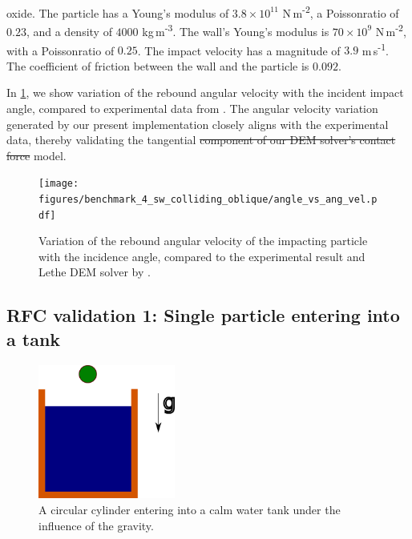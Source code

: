 \documentclass[preprint,12pt]{elsarticle}
\providecommand{\DIFaddtex}[1]{{\protect\color{blue}\uwave{#1}}} %
\providecommand{\DIFdeltex}[1]{{\protect\color{red}\sout{#1}}}                      %
\providecommand{\DIFaddbegin}{} %
\providecommand{\DIFaddend}{} %
\providecommand{\DIFdelbegin}{} %
\providecommand{\DIFdelend}{} %
\providecommand{\DIFaddbeginFL}{} %
\providecommand{\DIFaddendFL}{} %
\providecommand{\DIFdelbeginFL}{} %
\providecommand{\DIFdelendFL}{} %
\providecommand{\DIFadd}[1]{\texorpdfstring{\DIFaddtex{#1}}{#1}} %
\providecommand{\DIFdel}[1]{\texorpdfstring{\DIFdeltex{#1}}{}} %
\newcommand{\DIFscaledelfig}{0.5}
\newlength{\DIFdelgraphicswidth} %
\newlength{\DIFdelgraphicsheight} %
\newcommand{\DIFaddincludegraphics}[2][]{{\color{blue}\fbox{\DIFOincludegraphics[#1]{#2}}}} %
\newcommand{\DIFdelincludegraphics}[2][]{%
\sbox{\DIFdelgraphicsbox}{\DIFOincludegraphics[#1]{#2}}%
\settoboxwidth{\DIFdelgraphicswidth}{\DIFdelgraphicsbox} %
\settoboxtotalheight{\DIFdelgraphicsheight}{\DIFdelgraphicsbox} %
\scalebox{\DIFscaledelfig}{%
\parbox[b]{\DIFdelgraphicswidth}{\usebox{\DIFdelgraphicsbox}\\[-\baselineskip] \rule{\DIFdelgraphicswidth}{0em}}\llap{\resizebox{\DIFdelgraphicswidth}{\DIFdelgraphicsheight}{%
\setlength{\unitlength}{\DIFdelgraphicswidth}%
\begin{picture}(1,1)%
\thicklines\linethickness{2pt} %
{\color[rgb]{1,0,0}\put(0,0){\framebox(1,1){}}}%
{\color[rgb]{1,0,0}\put(0,0){\line( 1,1){1}}}%
{\color[rgb]{1,0,0}\put(0,1){\line(1,-1){1}}}%
\end{picture}%
}\hspace*{3pt}}} %
} %
\DeclareRobustCommand{\DIFaddbegin}{\DIFOaddbegin \let\includegraphics\DIFaddincludegraphics} %
\DeclareRobustCommand{\DIFaddend}{\DIFOaddend \let\includegraphics\DIFOincludegraphics} %
\DeclareRobustCommand{\DIFdelbegin}{\DIFOdelbegin \let\includegraphics\DIFdelincludegraphics} %
\DeclareRobustCommand{\DIFdelend}{\DIFOaddend \let\includegraphics\DIFOincludegraphics} %
\DeclareRobustCommand{\DIFaddbeginFL}{\DIFOaddbeginFL \let\includegraphics\DIFaddincludegraphics} %
\DeclareRobustCommand{\DIFaddendFL}{\DIFOaddendFL \let\includegraphics\DIFOincludegraphics} %
\DeclareRobustCommand{\DIFdelbeginFL}{\DIFOdelbeginFL \let\includegraphics\DIFdelincludegraphics} %
\DeclareRobustCommand{\DIFdelendFL}{\DIFOaddendFL \let\includegraphics\DIFOincludegraphics} %
\begin{document}
oxide. The particle has a Young's modulus of $3.8 \times 10^{11}$
N\,m\textsuperscript{-2}, a Poisson\DIFaddbegin \DIFadd{'s }\DIFaddend ratio of $0.23$, and a density of \DIFdelbegin \DIFdel{$4000$ }\DIFdelend \DIFaddbegin \DIFadd{$4,000$
}\DIFaddend kg\,m\textsuperscript{-3}. The wall's Young's modulus is $70\times 10^{9}$
N\,m\textsuperscript{-2}, with a Poisson\DIFaddbegin \DIFadd{'s }\DIFaddend ratio of $0.25$.  The impact velocity
has a magnitude of $3.9$ m\,s\textsuperscript{-1}. The coefficient of friction
between the wall and the particle is $0.092$.


In \cref{fig:result:dem_sw_contact_omega_vs_theta}, we show variation of the
rebound angular velocity with the incident impact angle, compared to
experimental data from \citet{kharaz2001experimental}.  The angular velocity
variation generated by our present implementation closely aligns with the
experimental data, thereby validating the tangential
\DIFdelbegin \DIFdel{component of our DEM
solver's contact force }\DIFdelend \DIFaddbegin \DIFadd{contact }\DIFaddend model.
\begin{figure}[!htpb]
  \centering
  \DIFdelbeginFL %
\DIFdelendFL \DIFaddbeginFL \texttt{[image: figures/benchmark\_4\_sw\_colliding\_oblique/angle\_vs\_ang\_vel.pdf]}
  \DIFaddendFL \caption{Variation of the rebound angular velocity of the impacting particle
    with the incidence angle, compared to the experimental result and Lethe
    DEM solver by \cite{golshan2023lethe}.}
  \label{fig:result:dem_sw_contact_omega_vs_theta}
\end{figure}


\FloatBarrier%
\subsection{RFC validation 1: Single particle entering into a tank}
\label{sec:rfc_validation_1_single_particle_entry}
\begin{figure}[!htpb]
  \centering
  \includegraphics[width=0.4\textwidth]{images/rfc_01_skillen_2013_particle_entry_in_hs_tank/Skillen_2013_particle_entry_in_hs_tank}
  \caption{A circular cylinder entering into a calm water tank under the
    influence of the gravity.}
  \label{fig:results_rfc_01_skillen_2013}
\end{figure}
\end{document}
